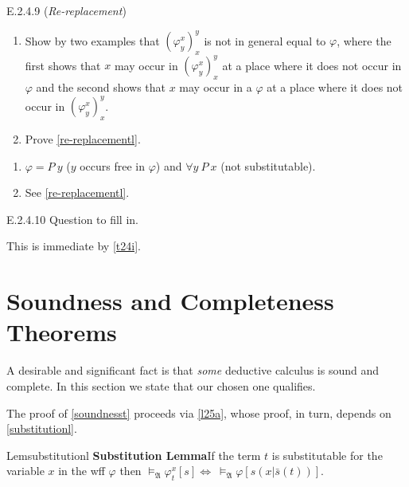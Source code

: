 \setcounter{exercise}{8}

\begin{exercise}{E.2.4.9}
  (\textit{Re-replacement})\begin{enumerate}[label=(\alph*)]
    \item Show by two examples that $(\varphi_y^x)_x^y$ is not in general equal to $\varphi$, where the first shows that $x$ may occur in $(\varphi_y^x)_x^y$ at a place where it does not occur in $\varphi$ and the second shows that $x$ may occur in a $\varphi$ at a place where it does not occur in $(\varphi_y^x)_x^y$.
    \item Prove \ref{re-replacementl}.\qedhere
  \end{enumerate}
\end{exercise}

\begin{enumerate}[label=(\alph*)]
  \item $\varphi=P\ y$ ($y$ occurs free in $\varphi$) and $\forall y\ P\ x$ (not substitutable).
  \item See \ref{re-replacementl}.
\end{enumerate}

\begin{exercise}{E.2.4.10}
  Question to fill in.
\end{exercise}

This is immediate by \ref{t24i}.

\section{Soundness and Completeness Theorems}\label{sec:2.5}

A desirable and significant fact is that \textit{some} deductive calculus is sound and complete. In this section we state that our chosen one qualifies.

The proof of \ref{soundnesst} proceeds via \ref{l25a}, whose proof, in turn, depends on \ref{substitutionl}.

\begin{reference}{Lem}{substitutionl}
  \textbf{Substitution Lemma}\quad If the term $t$ is substitutable for the variable $x$ in the wff $\varphi$ then $\vDash_{\mathfrak{A}}\varphi_t^x[s]\Leftrightarrow\ \vDash_{\mathfrak{A}}\varphi[s(x|\bar{s}(t))].$
\end{reference}

